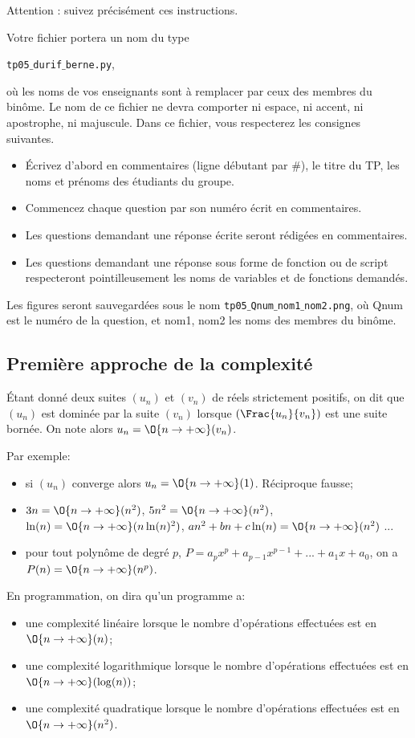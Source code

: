 Attention : suivez précisément ces instructions. 

Votre fichier portera un nom du type 
\begin{center}
  \texttt{tp05$\_$durif$\_$berne.py},
\end{center}
 où les noms de vos enseignants sont à remplacer par ceux des membres du binôme. Le nom de ce 
fichier ne devra comporter ni espace, ni accent, ni apostrophe, ni majuscule.
Dans ce fichier, vous respecterez les consignes suivantes.
\begin{itemize}
  \item \'Ecrivez d'abord en commentaires (ligne débutant par \#), le titre du TP, les noms et prénoms des étudiants du groupe.
  \item Commencez chaque question par son numéro écrit en commentaires.
  \item Les questions demandant une réponse écrite seront rédigées en commentaires.
  \item Les questions demandant une réponse sous forme de fonction ou de script respecteront pointilleusement les noms de variables et de fonctions demandés.
\end{itemize}
Les figures seront sauvegardées sous le nom \texttt{tp05$\_$Qnum$\_$nom1$\_$nom2.png}, où Qnum est le numéro de la question, et nom1, nom2 les noms des membres du binôme.



\subsection*{Première approche de la complexité}
	
Étant donné deux suites $(u_n)$ et $(v_n)$  de réels strictement positifs, on dit que $(u_n)$ est dominée par la suite $(v_n)$ lorsque $\left(\Frac{u_n}{v_n}\right)$ est une suite bornée. On note alors $u_n=\O{n\to +\infty}(v_n)$.

Par exemple:
\begin{itemize}
\item  si $(u_n)$ converge alors $u_n=\O{n\to +\infty}(1)$. Réciproque fausse;

\item   $3n=\O{n\to +\infty}(n^2)$, $5n^2=\O{n\to +\infty}(n^2)$, $\ln(n)=\O{n\to +\infty}(n\ln(n)^2)$, $an^2+bn+c\ln(n)=\O{n\to +\infty}(n^2)$ ...

\item  pour tout polynôme de degré $p$, $P=a_px^p+a_{p-1}x^{p-1}+...+a_1x+a_0$, on a $P(n)=\O{n\to +\infty}(n^p)$.
\end{itemize}

En programmation, on dira qu'un programme a:
\begin{itemize}
\item une complexité linéaire lorsque le nombre d'opérations effectuées est en $\O{n\to +\infty}(n)$;
\item une complexité logarithmique lorsque le nombre d'opérations effectuées est en $\O{n\to +\infty}(\log(n))$;
\item une complexité quadratique lorsque le nombre d'opérations effectuées est en $\O{n\to +\infty}(n^2)$.
\end{itemize}